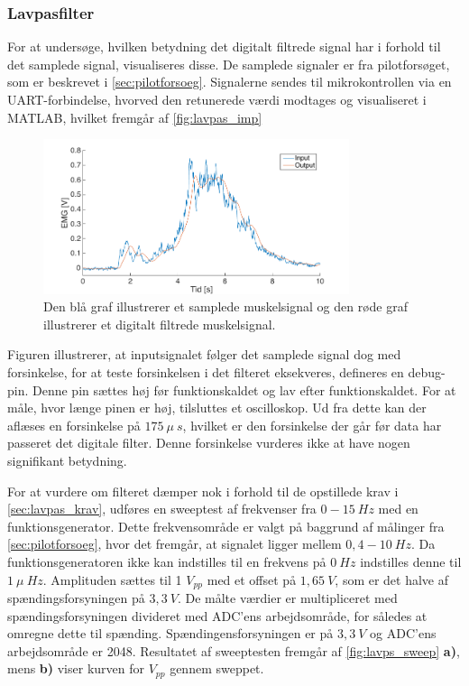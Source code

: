 \subsubsection{Lavpasfilter}
For at undersøge, hvilken betydning det digitalt filtrede signal har i forhold til det samplede signal, visualiseres disse. De samplede signaler er fra pilotforsøget, som er beskrevet i \autoref{sec:pilotforsoeg}. Signalerne sendes til mikrokontrollen via en UART-forbindelse, hvorved den retunerede værdi modtages og visualiseret i MATLAB, hvilket fremgår af \autoref{fig:lavpas_imp}

\begin{figure}[H]
\centering
\includegraphics[width=0.8\textwidth]{figures/EMG_test}
\caption{Den blå graf illustrerer et samplede muskelsignal og den røde graf illustrerer et digitalt filtrede muskelsignal.}
\label{fig:lavpas_imp}
\end{figure}

\noindent
Figuren illustrerer, at inputsignalet følger det samplede signal dog med forsinkelse, for at teste forsinkelsen i det filteret eksekveres, defineres en debug-pin. Denne pin sættes høj før funktionskaldet og lav efter funktionskaldet. For at måle, hvor længe pinen er høj, tilsluttes et oscilloskop. Ud fra dette kan der aflæses en forsinkelse på $175~\mu~s$, hvilket er den forsinkelse der går før data har passeret det digitale filter. Denne forsinkelse vurderes ikke at have nogen signifikant betydning.

For at vurdere om filteret dæmper nok i forhold til de opstillede krav i \autoref{sec:lavpas_krav}, udføres en sweeptest af frekvenser fra $0-15~Hz$ med en funktionsgenerator. Dette frekvensområde er valgt på baggrund af målinger fra \autoref{sec:pilotforsoeg}, hvor det fremgår, at signalet ligger mellem $0,4-10~Hz$.  Da funktionsgeneratoren ikke kan indstilles til en frekvens på $0~Hz$ indstilles denne til $1~\mu~Hz$. Amplituden sættes til 1 $V_{pp}$ med et offset på $1,65~V$, som er det halve af spændingsforsyningen på $3,3~V$. De målte værdier er multipliceret med spændingsforsyningen divideret med ADC'ens arbejdsområde, for således at omregne dette til spænding. Spændingensforsyningen er på $3,3~V$ og ADC'ens arbejdsområde er 2048. Resultatet af sweeptesten fremgår af \autoref{fig:lavps_sweep} \textbf{a)}, mens \textbf{b)} viser kurven for $V_{pp}$ gennem sweppet.

